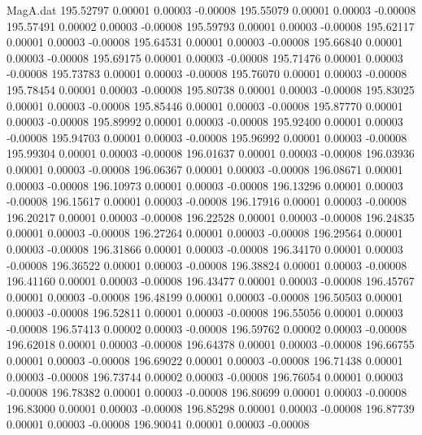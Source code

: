 \begin{filecontents}{MagA.dat}
 195.52797    0.00001    0.00003   -0.00008
 195.55079    0.00001    0.00003   -0.00008
 195.57491    0.00002    0.00003   -0.00008
 195.59793    0.00001    0.00003   -0.00008
 195.62117    0.00001    0.00003   -0.00008
 195.64531    0.00001    0.00003   -0.00008
 195.66840    0.00001    0.00003   -0.00008
 195.69175    0.00001    0.00003   -0.00008
 195.71476    0.00001    0.00003   -0.00008
 195.73783    0.00001    0.00003   -0.00008
 195.76070    0.00001    0.00003   -0.00008
 195.78454    0.00001    0.00003   -0.00008
 195.80738    0.00001    0.00003   -0.00008
 195.83025    0.00001    0.00003   -0.00008
 195.85446    0.00001    0.00003   -0.00008
 195.87770    0.00001    0.00003   -0.00008
 195.89992    0.00001    0.00003   -0.00008
 195.92400    0.00001    0.00003   -0.00008
 195.94703    0.00001    0.00003   -0.00008
 195.96992    0.00001    0.00003   -0.00008
 195.99304    0.00001    0.00003   -0.00008
 196.01637    0.00001    0.00003   -0.00008
 196.03936    0.00001    0.00003   -0.00008
 196.06367    0.00001    0.00003   -0.00008
 196.08671    0.00001    0.00003   -0.00008
 196.10973    0.00001    0.00003   -0.00008
 196.13296    0.00001    0.00003   -0.00008
 196.15617    0.00001    0.00003   -0.00008
 196.17916    0.00001    0.00003   -0.00008
 196.20217    0.00001    0.00003   -0.00008
 196.22528    0.00001    0.00003   -0.00008
 196.24835    0.00001    0.00003   -0.00008
 196.27264    0.00001    0.00003   -0.00008
 196.29564    0.00001    0.00003   -0.00008
 196.31866    0.00001    0.00003   -0.00008
 196.34170    0.00001    0.00003   -0.00008
 196.36522    0.00001    0.00003   -0.00008
 196.38824    0.00001    0.00003   -0.00008
 196.41160    0.00001    0.00003   -0.00008
 196.43477    0.00001    0.00003   -0.00008
 196.45767    0.00001    0.00003   -0.00008
 196.48199    0.00001    0.00003   -0.00008
 196.50503    0.00001    0.00003   -0.00008
 196.52811    0.00001    0.00003   -0.00008
 196.55056    0.00001    0.00003   -0.00008
 196.57413    0.00002    0.00003   -0.00008
 196.59762    0.00002    0.00003   -0.00008
 196.62018    0.00001    0.00003   -0.00008
 196.64378    0.00001    0.00003   -0.00008
 196.66755    0.00001    0.00003   -0.00008
 196.69022    0.00001    0.00003   -0.00008
 196.71438    0.00001    0.00003   -0.00008
 196.73744    0.00002    0.00003   -0.00008
 196.76054    0.00001    0.00003   -0.00008
 196.78382    0.00001    0.00003   -0.00008
 196.80699    0.00001    0.00003   -0.00008
 196.83000    0.00001    0.00003   -0.00008
 196.85298    0.00001    0.00003   -0.00008
 196.87739    0.00001    0.00003   -0.00008
 196.90041    0.00001    0.00003   -0.00008

\end{filecontents}
